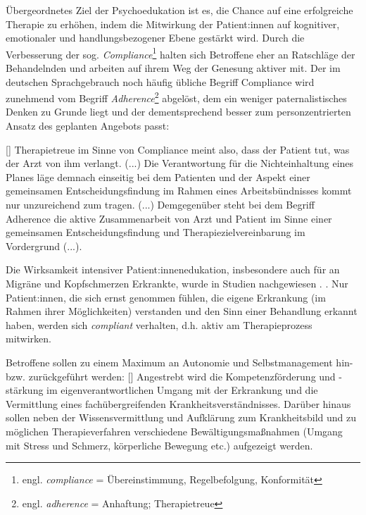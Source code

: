 \documentclass[
  twoside,
  parskip=half-,
  paper=176mm:246mm,
  BCOR=14mm,
  DIV=14,
]{scrreprt}
\makeatletter
\renewenvironment*{displayquote}
  {\begingroup\setlength{\leftmargini}{0pt}\csq@getcargs{\csq@bdquote{}{}}}
  {\csq@edquote\endgroup}
\makeatother
\begin{document}
Übergeordnetes Ziel der Psychoedukation ist es, die Chance auf eine erfolgreiche Therapie zu erhöhen, indem die Mitwirkung der Patient:innen auf kognitiver, emotionaler und handlungsbezogener Ebene gestärkt wird. Durch die Verbesserung der sog. \textit{Compliance}\footnote{engl. \textit{compliance} = Übereinstimmung, Regelbefolgung, Konformität} halten sich Betroffene eher an Ratschläge der Behandelnden und arbeiten auf ihrem Weg der Genesung aktiver mit. Der im deutschen Sprachgebrauch noch häufig übliche Begriff Compliance wird zunehmend vom Begriff \textit{Adherence}\footnote{engl. \textit{adherence} = Anhaftung; Therapietreue} abgelöst, dem ein weniger paternalistisches Denken zu Grunde liegt und der dementsprechend besser zum personzentrierten Ansatz des geplanten Angebots passt: 

\begin{displayquote}[{\cite[]{adherence}}]
  Therapietreue im Sinne von Compliance meint also, dass der Patient tut, was der Arzt von ihm verlangt. (...) Die Verantwortung für die Nichteinhaltung eines Planes läge demnach einseitig bei dem Patienten und der Aspekt einer gemeinsamen Entscheidungsfindung im Rahmen eines Arbeitsbündnisses kommt nur unzureichend zum tragen. (...) Demgegenüber steht bei dem Begriff Adherence die aktive Zusammenarbeit von Arzt und Patient im Sinne einer gemeinsamen Entscheidungsfindung und Therapiezielvereinbarung im Vordergrund (...).
\end{displayquote}

Die Wirksamkeit intensiver Patient:innenedukation, insbesondere auch für an Migräne und Kopfschmerzen Erkrankte, wurde in Studien nachgewiesen \autocite[vgl.][]{rothrock}.
. Nur Patient:innen, die sich ernst genommen fühlen, die eigene Erkrankung (im Rahmen ihrer Möglichkeiten) verstanden und den Sinn einer Behandlung erkannt haben, werden sich \textit{compliant} verhalten, d.h. aktiv am Therapieprozess mitwirken.  

Betroffene sollen zu einem Maximum an Autonomie und Selbstmanagement hin- bzw. zurückgeführt werden: 
\begin{displayquote}[{\cite[24]{wachter}}]
  Angestrebt wird die Kompetenzförderung und -stärkung im eigenverantwortlichen Umgang mit der Erkrankung und die Vermittlung eines fachübergreifenden Krankheitsverständnisses. Darüber hinaus sollen neben der Wissensvermittlung und Aufklärung zum Krankheitsbild und zu möglichen Therapieverfahren verschiedene Bewältigungsmaßnahmen (Umgang mit Stress und Schmerz, körperliche Bewegung etc.) aufgezeigt werden.
\end{displayquote}
\end{document}
